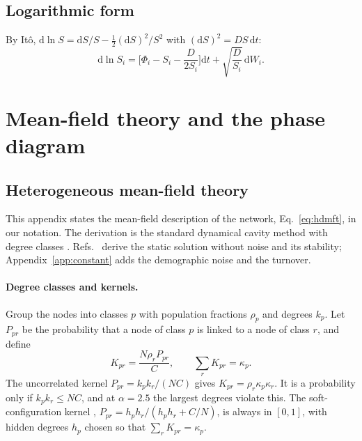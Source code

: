 \documentclass[pre,twocolumn,superscriptaddress,nofootinbib]{revtex4-2}
\newcommand{\dd}{\mathrm d}
\begin{document}
\subsection{Logarithmic form}

By It\^o, $\dd\ln S=\dd S/S-\tfrac12(\dd S)^2/S^2$ with $(\dd S)^2=DS\,\dd t$:
\begin{equation}
\dd\ln S_i=\Big[\Phi_i-S_i-\frac{D}{2S_i}\Big]\dd t+\sqrt{\frac{D}{S_i}}\,\dd W_i .
\label{eq:app-log}
\end{equation}

\section{Mean-field theory and the phase diagram}
\label{app:hdmft}

\subsection{Heterogeneous mean-field theory}

This appendix states the mean-field description of the network, Eq.~\eqref{eq:hdmft}, in our notation.  The
derivation is the standard dynamical cavity method with degree classes \cite{bunin2017,galla2018,aguirrelopez}.
Refs.~\cite{aguirrelopez,poley2025,patil2026} derive the static solution without noise and its stability;
Appendix~\ref{app:constant} adds the demographic noise and the turnover.

\paragraph{Degree classes and kernels.}  Group the nodes into classes $p$ with population fractions $\rho_p$ and
degrees $k_p$.  Let $P_{pr}$ be the probability that a node of class $p$ is linked to a node of class $r$, and
define
\begin{equation}
K_{pr}=\frac{N\rho_rP_{pr}}{C},\qquad\sum_rK_{pr}=\kappa_p .
\end{equation}
The uncorrelated kernel $P_{pr}=k_pk_r/(NC)$ gives $K_{pr}=\rho_r\kappa_p\kappa_r$.  It is a probability only if
$k_pk_r\le NC$, and at $\alpha=2.5$ the largest degrees violate this.  The soft-configuration kernel
\cite{patil2026}, $P_{pr}=h_ph_r/(h_ph_r+C/N)$, is always in $[0,1]$, with hidden degrees $h_p$ chosen so that
$\sum_rK_{pr}=\kappa_p$.
\end{document}
